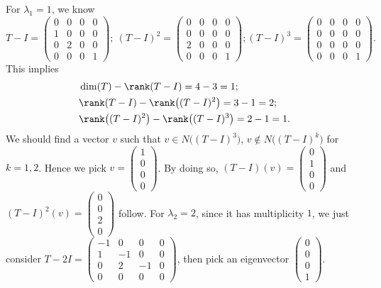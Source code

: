 \begin{Exercise}
\begin{enumerate}[(a)]
\begin{solution}
			For $\lambda_1 = 1$, we know
			$$
			T-I = \begin{pmatrix}
			0 & 0 & 0 & 0 \\
			1 & 0 & 0 & 0 \\
			0 & 2 & 0 & 0 \\
			0 & 0 & 0 & 1
			\end{pmatrix};\
			(T-I)^2 = \begin{pmatrix}
			0 & 0 & 0 & 0 \\
			0 & 0 & 0 & 0 \\
			2 & 0 & 0 & 0 \\
			0 & 0 & 0 & 1
			\end{pmatrix}; 
			(T-I)^3 = \begin{pmatrix}
			0 & 0 & 0 & 0 \\
			0 & 0 & 0 & 0 \\
			0 & 0 & 0 & 0 \\
			0 & 0 & 0 & 1
			\end{pmatrix}.
			$$
			This implies
			\begin{align*}
			&\dim(T)-\rank(T-I) = 4-3 = 1; \\
			&\rank(T-I) - \rank\big((T-I)^2\big) = 3 - 1 = 2; \\
			&\rank\big((T-I)^2\big) - \rank\big((T-I)^3\big) = 2-1 = 1.
			\end{align*}
			We should find a vector $v$ such that $v\in N\big((T-I)^3\big)$, $v\notin N\big((T-I)^k\big)$ for $k=1,2$. Hence we pick $v = \begin{pmatrix}
			1 \\
			0 \\
			0 \\
			0
			\end{pmatrix}$. By doing so, $(T-I)(v) = \begin{pmatrix}
			0 \\
			1 \\
			0 \\
			0
			\end{pmatrix}$ and $(T-I)^2(v) = \begin{pmatrix}
			0 \\
			0 \\
			2 \\
			0
			\end{pmatrix}$ follow.
			For $\lambda_2 = 2$, since it has multiplicity $1$, we just consider $T-2I = \begin{pmatrix}
			-1 & 0 & 0 & 0 \\
			1 & -1 & 0 & 0 \\
			0 & 2 & -1 & 0 \\
			0 & 0 & 0 & 0
			\end{pmatrix}$, then pick an eigenvector $\begin{pmatrix}
			0 \\
			0 \\
			0 \\
			1
			\end{pmatrix}$.
			

\end{solution}
\end{enumerate}
\end{Exercise}
